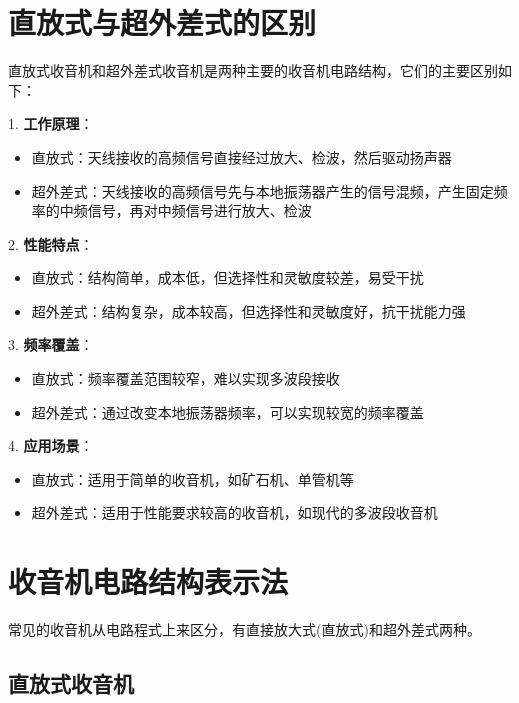 \documentclass[12pt,UTF8]{ctexbook}
\begin{document}
\section{直放式与超外差式的区别}

直放式收音机和超外差式收音机是两种主要的收音机电路结构，它们的主要区别如下：

1. \textbf{工作原理}：
   \begin{itemize}[leftmargin=3.5em]
   \item 直放式：天线接收的高频信号直接经过放大、检波，然后驱动扬声器
   \item 超外差式：天线接收的高频信号先与本地振荡器产生的信号混频，产生固定频率的中频信号，再对中频信号进行放大、检波
   \end{itemize}

2. \textbf{性能特点}：
   \begin{itemize}[leftmargin=3.5em]
   \item 直放式：结构简单，成本低，但选择性和灵敏度较差，易受干扰
   \item 超外差式：结构复杂，成本较高，但选择性和灵敏度好，抗干扰能力强
   \end{itemize}

3. \textbf{频率覆盖}：
   \begin{itemize}[leftmargin=3.5em]
   \item 直放式：频率覆盖范围较窄，难以实现多波段接收
   \item 超外差式：通过改变本地振荡器频率，可以实现较宽的频率覆盖
   \end{itemize}

4. \textbf{应用场景}：
   \begin{itemize}[leftmargin=3.5em]
   \item 直放式：适用于简单的收音机，如矿石机、单管机等
   \item 超外差式：适用于性能要求较高的收音机，如现代的多波段收音机
   \end{itemize}

\section{收音机电路结构表示法}

常见的收音机从电路程式上来区分，有直接放大式(直放式)和超外差式两种。

\subsection{直放式收音机}
\end{document}

